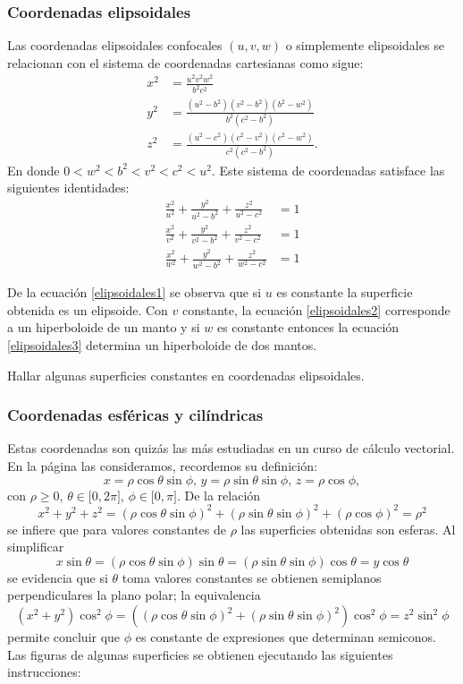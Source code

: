 \subsubsection{Coordenadas elipsoidales} 
Las coordenadas elipsoidales confocales $\left( u,v,w\right) $ o simplemente elipsoidales se relacionan con el sistema de coordenadas cartesianas como sigue:
\begin{align*}
x^{2} &=\frac{u^2 v^2 w^2}{b^2 c^2} \\
y^{2} &=\frac{(u^2-b^2)(v^2-b^2)(b^2-w^2)}{b^2(c^2-b^2)} \\
z^{2} &=\frac{(u^2-c^2)(c^2-v^2)(c^2-w^2)}{c^2(c^2-b^2)}.
\end{align*}
En donde  $0<w^2<b^2<v^2<c^2<u^2$. Este sistema de coordenadas satisface las siguientes identidades:
\begin{align}
\frac{x^2}{u^2}+\frac{y^2}{u^2-b^2}+\frac{z^2}{u^2-c^2} &= 1 \label{elipsoidales1}\\
\frac{x^2}{v^2}+\frac{y^2}{v^2-b^2}+\frac{z^2}{v^2-c^2} &=1 \label{elipsoidales2}\\
\frac{x^2}{w^2}+\frac{y^2}{w^2-b^2}+\frac{z^2}{w^2-c^2} &=1 \label{elipsoidales3}
\end{align}

De la ecuación \ref{elipsoidales1} se observa que si $u$ es constante la superficie obtenida es un elipsoide. Con $v$ constante, la ecuación \ref{elipsoidales2} corresponde a un \mbox{hiperboloide} de un manto y si $w$ es constante entonces la ecuación \ref{elipsoidales3} determina un hiperboloide de dos mantos.

\begin{ejer}
Hallar algunas superficies constantes en coordenadas elipsoidales.
\end{ejer}

\subsubsection{Coordenadas esféricas y cilíndricas} 
Estas coordenadas son quizás las más estudiadas en un curso de cálculo vectorial. En la página \pageref{esfericas} las consideramos, recordemos su definición:
\[x=\rho \cos \theta \sin \phi, \, y=\rho \sin \theta \sin \phi,\,z=\rho \cos \phi,\]
con $\rho \geq 0$, $\theta \in \lbrack 0,2\pi ]$, $\phi \in \lbrack 0,\pi ]$.
De la relación
\[x^{2}+y^{2}+z^{2}=(\rho \cos \theta \sin \phi)^{2}+(\rho \sin \theta \sin \phi)^{2}+(\rho \cos \phi) ^{2}=\rho ^{2}\]
se infiere que para valores constantes de $\rho $ las superficies obtenidas son esferas.
Al simplificar
\[x\sin \theta =( \rho \cos \theta \sin \phi)\sin \theta =( \rho \sin \theta \sin \phi ) \cos \theta
=y\cos \theta\]
se evidencia que si $\theta $ toma valores constantes se obtienen semiplanos perpendiculares la plano polar;
la equivalencia
\[(x^{2}+y^{2}) \cos ^{2}\phi = ( ( \rho \cos \theta\sin \phi ) ^{2}+( \rho \sin \theta \sin \phi ) ^{2})
\cos^{2}\phi =z^{2}\sin^{2}\phi\]
permite concluir que $\phi $ es constante de expresiones que determinan semiconos.
Las figuras de algunas superficies se obtienen ejecutando las siguientes instrucciones:

